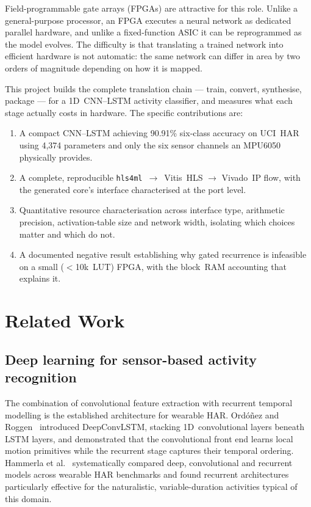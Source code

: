 \documentclass[11pt,a4paper]{article}
\begin{document}
Field-programmable gate arrays (FPGAs) are attractive for this role. Unlike a
general-purpose processor, an FPGA executes a neural network as dedicated
parallel hardware, and unlike a fixed-function ASIC it can be reprogrammed as
the model evolves. The difficulty is that translating a trained network into
efficient hardware is not automatic: the same network can differ in area by two
orders of magnitude depending on how it is mapped.

This project builds the complete translation chain --- train, convert,
synthesise, package --- for a 1D~CNN--LSTM activity classifier, and measures
what each stage actually costs in hardware. The specific contributions are:

\begin{enumerate}
  \item A compact CNN--LSTM achieving 90.91\% six-class accuracy on UCI~HAR
        using 4{,}374 parameters and only the six sensor channels an MPU6050
        physically provides.
  \item A complete, reproducible \texttt{hls4ml}~$\rightarrow$~Vitis~HLS
        $\rightarrow$ Vivado~IP flow, with the generated core's interface
        characterised at the port level.
  \item Quantitative resource characterisation across interface type,
        arithmetic precision, activation-table size and network width,
        isolating which choices matter and which do not.
  \item A documented negative result establishing why gated recurrence is
        infeasible on a small ($<$10k~LUT) FPGA, with the block~RAM accounting
        that explains it.
\end{enumerate}

\section{Related Work}

\subsection{Deep learning for sensor-based activity recognition}

The combination of convolutional feature extraction with recurrent temporal
modelling is the established architecture for wearable HAR. Ordóñez and
Roggen~\cite{ordonez2016} introduced DeepConvLSTM, stacking 1D~convolutional
layers beneath LSTM layers, and demonstrated that the convolutional front end
learns local motion primitives while the recurrent stage captures their
temporal ordering. Hammerla et al.~\cite{hammerla2016} systematically compared
deep, convolutional and recurrent models across wearable HAR benchmarks and
found recurrent architectures particularly effective for the naturalistic,
variable-duration activities typical of this domain.
\end{document}
